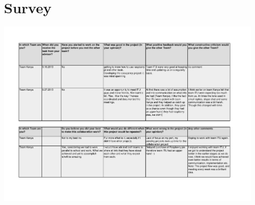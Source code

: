 \section{Survey}\label{sec:survey_result}
\includegraphics[scale=0.75,angle=90]{appendix/Survey_Answers_from_Team_Kenya.pdf}